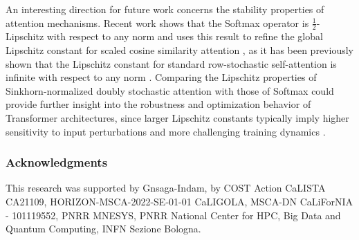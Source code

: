 \documentclass{article}
\theoremstyle{definition}
\theoremstyle{plain}
\begin{document}
An interesting direction for future work concerns the stability properties of attention mechanisms. Recent work \cite{Nair2025SoftmaxI1} shows that the Softmax operator is $\frac{1}{2}$-Lipschitz with respect to any norm and uses this result to refine the global Lipschitz constant for scaled cosine similarity attention \cite{Qi2023LipsFormerIL}, as it has been previously shown that the Lipschitz constant for standard row-stochastic self-attention is infinite with respect to any norm \cite{Kim2020TheLC}. Comparing the Lipschitz properties of Sinkhorn-normalized doubly stochastic attention with those of Softmax could provide further insight into the robustness and optimization behavior of Transformer architectures, since larger Lipschitz constants typically imply higher sensitivity to input perturbations and more challenging training dynamics \cite{Cranko2018LipschitzNA}.


\subsubsection*{Acknowledgments}
This research was supported by Gnsaga-Indam, by COST Action CaLISTA CA21109, HORIZON-MSCA-2022-SE-01-01 CaLIGOLA, MSCA-DN CaLiForNIA - 101119552, PNRR MNESYS, PNRR National Center for HPC, Big Data and Quantum Computing, INFN Sezione Bologna.

  
  
\end{document}
